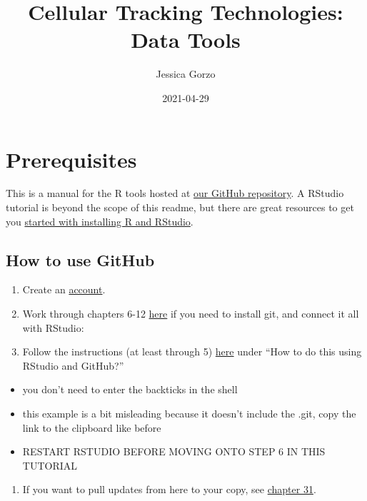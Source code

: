 \documentclass[
]{book}
\title{Cellular Tracking Technologies: Data Tools}
\author{Jessica Gorzo}
\date{2021-04-29}
\providecommand{\tightlist}{%
  \setlength{\itemsep}{0pt}\setlength{\parskip}{0pt}}
\begin{document}
\maketitle

{
\setcounter{tocdepth}{1}
\tableofcontents
}
\hypertarget{prerequisites}{%
\chapter*{Prerequisites}\label{prerequisites}}

This is a manual for the R tools hosted at \href{https://github.com/cellular-tracking-technologies/data_tools}{our GitHub repository}. A RStudio tutorial is beyond the scope of this readme, but there are great resources to get you \href{https://www.earthdatascience.org/courses/earth-analytics/document-your-science/setup-r-rstudio/}{started with installing R and RStudio}.

\hypertarget{how-to-use-github}{%
\section*{How to use GitHub}\label{how-to-use-github}}

\begin{enumerate}
\def\labelenumi{\arabic{enumi}.}
\tightlist
\item
  Create an \href{https://github.com}{account}.
\item
  Work through chapters 6-12 \href{https://happygitwithr.com/install-git.html}{here} if you need to install git, and connect it all with RStudio:
\item
  Follow the instructions (at least through 5) \href{https://r-bio.github.io/intro-git-rstudio/}{here} under ``How to do this using RStudio and GitHub?''
\end{enumerate}

\begin{itemize}
\tightlist
\item
  you don't need to enter the backticks in the shell
\item
  this example is a bit misleading because it doesn't include the .git, copy the link to the clipboard like before
\item
  RESTART RSTUDIO BEFORE MOVING ONTO STEP 6 IN THIS TUTORIAL
\end{itemize}

\begin{enumerate}
\def\labelenumi{\arabic{enumi}.}
\setcounter{enumi}{3}
\tightlist
\item
  If you want to pull updates from here to your copy, see \href{https://happygitwithr.com/upstream-changes.html\#pull-changes-from-upstream}{chapter 31}.
\end{enumerate}
\end{document}
